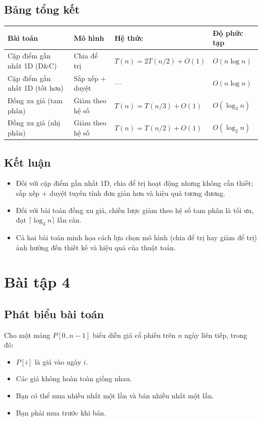 \documentclass{article}
\begin{document}
\subsection{Bảng tổng kết}

\begin{tabular}{|l|l|l|l|}
\hline
\textbf{Bài toán} & \textbf{Mô hình} & \textbf{Hệ thức} & \textbf{Độ phức tạp} \\
\hline
Cặp điểm gần nhất 1D (D\&C) & Chia để trị & \(T(n) = 2T(n/2) + O(1)\) & \(O(n \log n)\) \\
Cặp điểm gần nhất 1D (tốt hơn) & Sắp xếp + duyệt & — & \(O(n \log n)\) \\
Đồng xu giả (tam phân) & Giảm theo hệ số & \(T(n) = T(n/3) + O(1)\) & \(O(\log_3 n)\) \\
Đồng xu giả (nhị phân) & Giảm theo hệ số & \(T(n) = T(n/2) + O(1)\) & \(O(\log_2 n)\) \\
\hline
\end{tabular}

\subsection{Kết luận}

\begin{itemize}
    \item Đối với cặp điểm gần nhất 1D, chia để trị hoạt động nhưng không cần thiết; sắp xếp + duyệt tuyến tính đơn giản hơn và hiệu quả tương đương.
    \item Đối với bài toán đồng xu giả, chiến lược giảm theo hệ số tam phân là tối ưu, đạt \(\lceil \log_3 n \rceil\) lần cân.
    \item Cả hai bài toán minh họa cách lựa chọn mô hình (chia để trị hay giảm để trị) ảnh hưởng đến thiết kế và hiệu quả của thuật toán.
\end{itemize}

\section{Bài tập 4}

\subsection{Phát biểu bài toán}

Cho một mảng \(P[0..n-1]\) biểu diễn giá cổ phiếu trên \(n\) ngày liên tiếp, trong đó:
\begin{itemize}
    \item \(P[i]\) là giá vào ngày \(i\).
    \item Các giá không hoàn toàn giống nhau.
    \item Bạn có thể mua nhiều nhất một lần và bán nhiều nhất một lần.
    \item Bạn phải mua trước khi bán.
\end{itemize}
\end{document}
